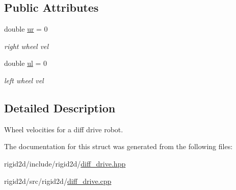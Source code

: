 \subsection*{Public Attributes}
\begin{DoxyCompactItemize}
\item 
\mbox{\label{structrigid2d_1_1WheelVelocities_a647f6d1dd95af0323780c8b7d639ccf3}} 
double \hyperlink{structrigid2d_1_1WheelVelocities_a647f6d1dd95af0323780c8b7d639ccf3}{ur} = 0
\begin{DoxyCompactList}\small\item\em right wheel vel \end{DoxyCompactList}\item 
\mbox{\label{structrigid2d_1_1WheelVelocities_a7e2524297e82e99d40e575633184d060}} 
double \hyperlink{structrigid2d_1_1WheelVelocities_a7e2524297e82e99d40e575633184d060}{ul} = 0
\begin{DoxyCompactList}\small\item\em left wheel vel \end{DoxyCompactList}\end{DoxyCompactItemize}


\subsection{Detailed Description}
Wheel velocities for a diff drive robot. 

The documentation for this struct was generated from the following files\+:\begin{DoxyCompactItemize}
\item 
rigid2d/include/rigid2d/\hyperlink{diff__drive_8hpp}{diff\+\_\+drive.\+hpp}\item 
rigid2d/src/rigid2d/\hyperlink{diff__drive_8cpp}{diff\+\_\+drive.\+cpp}\end{DoxyCompactItemize}
